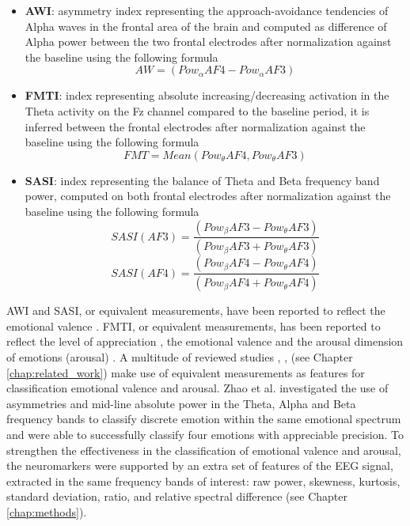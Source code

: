 \begin{itemize}
\item \textbf{\ac{AWI}}: asymmetry index representing the approach-avoidance tendencies of Alpha waves in the frontal area of the brain and computed as difference of Alpha power between the two frontal electrodes after normalization against the baseline using the following formula 
		\[AW = (Pow_\alpha AF4 - Pow_\alpha AF3) \]
\item \textbf{\ac{FMTI}}: index representing absolute increasing/decreasing activation in the Theta activity on the Fz channel compared to the baseline period, it is inferred between the frontal electrodes after normalization against the baseline using the following formula 
			\[FMT = Mean(Pow_\theta AF4 , Pow_\theta AF3)  \]
\item \textbf{\ac{SASI}}: index representing the balance of Theta and Beta frequency band power, computed on both frontal electrodes after normalization against the baseline using the following formula 
		\[SASI(AF3)= \frac{(Pow_\beta AF3 - Pow_\theta AF3)}{(Pow_\beta AF3 + Pow_\theta AF3)} \] \[SASI(AF4)= \frac{(Pow_\beta AF4 - Pow_\theta AF4)}{(Pow_\beta AF4 + Pow_\theta AF4)} \]  
\end{itemize}

\ac{AWI} and \ac{SASI}, or equivalent measurements, have been reported to reflect the emotional valence \cite{schmidt_frontal_2001,orgo_effect_2015}. \ac{FMTI}, or equivalent measurements, has been reported to reflect the level of appreciation \cite{sammler_music_nodate}, the emotional valence \cite{reuderink_valence_2013} and the arousal dimension of emotions (arousal) \cite{zhao_frontal_2018}. A multitude of reviewed studies \cite{lin_eeg-based_2009,lin_eeg-based_2010}, \cite{wu_estimation_2017,thammasan_continuous_2016}, \cite{ koelstra_deap_2012} (see Chapter \ref{chap:related_work}) make use of equivalent measurements as features for classification emotional valence and arousal. Zhao et al. \cite{zhao_frontal_2018} investigated the use of asymmetries and mid-line absolute power in the Theta, Alpha and Beta frequency bands to classify discrete emotion within the same emotional spectrum and were able to successfully classify four emotions with appreciable precision. To strengthen the effectiveness in the classification of emotional valence and arousal, the neuromarkers were supported by an extra set of features of the \ac{EEG} signal, extracted in the same frequency bands of interest: raw power, skewness, kurtosis, standard deviation, ratio, and relative spectral difference (see Chapter \ref{chap:methods}).

